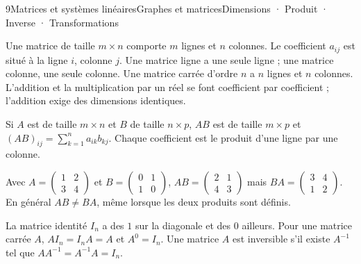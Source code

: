 \begin{ouverture}[courbe]{9}{Matrices et systèmes linéaires}{Graphes et matrices}{Dimensions · Produit · Inverse · Transformations}
\end{ouverture}
\essentiel

Une matrice de taille $m\times n$ comporte $m$ lignes et $n$ colonnes. Le coefficient $a_{ij}$ est situé à la ligne $i$, colonne $j$.
Une matrice ligne a une seule ligne ; une matrice colonne, une seule colonne. Une matrice carrée d'ordre $n$ a $n$ lignes et $n$ colonnes.
L'addition et la multiplication par un réel se font coefficient par coefficient ; l'addition exige des dimensions identiques.
\begin{definition}[Produit]
Si $A$ est de taille $m\times n$ et $B$ de taille $n\times p$, $AB$ est de taille $m\times p$ et
$(AB)_{ij}=\sum_{k=1}^na_{ik}b_{kj}$.
Chaque coefficient est le produit d'une ligne par une colonne.
\end{definition}
\begin{exemple}
Avec $A=\begin{pmatrix}1&2\\3&4\end{pmatrix}$ et $B=\begin{pmatrix}0&1\\1&0\end{pmatrix}$,
$AB=\begin{pmatrix}2&1\\4&3\end{pmatrix}$ mais $BA=\begin{pmatrix}3&4\\1&2\end{pmatrix}$.
En général $AB\ne BA$, même lorsque les deux produits sont définis.
\end{exemple}
La matrice identité $I_n$ a des $1$ sur la diagonale et des $0$ ailleurs. Pour une matrice carrée $A$, $AI_n=I_nA=A$ et $A^0=I_n$.
Une matrice $A$ est inversible s'il existe $A^{-1}$ tel que $AA^{-1}=A^{-1}A=I_n$.
